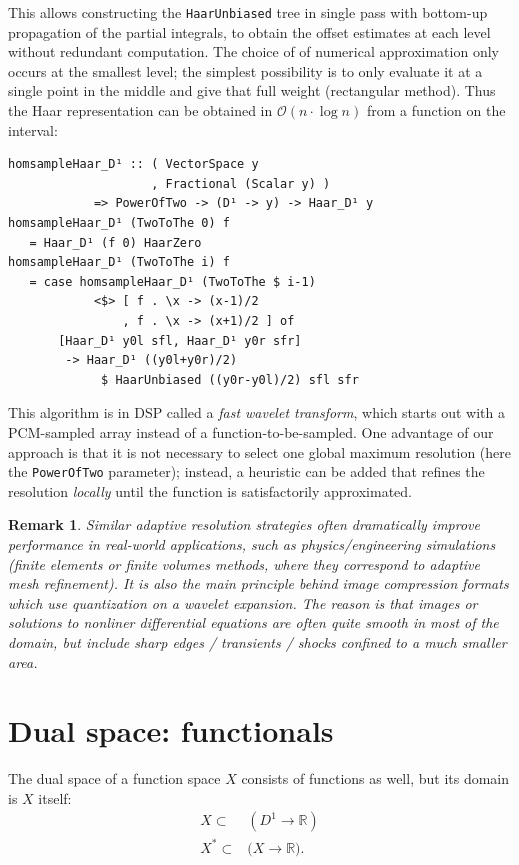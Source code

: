 \documentclass[sigplan,review,anonymous]{acmart}\settopmatter{printfolios=true,printccs=false,printacmref=false}
\theoremstyle{acmplain}
\theoremstyle{acmdefinition}
\newtheorem{remark}[theorem]{Remark}
\begin{document}
This allows constructing the \lstinline`HaarUnbiased` tree in single pass with bottom-up propagation of the partial integrals, to obtain the offset estimates at each level without redundant computation.
The choice of of numerical approximation only occurs at the smallest level;
the simplest possibility is to only evaluate it at a single point in the middle and give that full weight (rectangular method).
Thus the Haar representation can be obtained in $\mathcal{O}(n\cdot\log n)$ from a function on the interval:
\begin{lstlisting}
homsampleHaar_D¹ :: ( VectorSpace y
                    , Fractional (Scalar y) )
            => PowerOfTwo -> (D¹ -> y) -> Haar_D¹ y
homsampleHaar_D¹ (TwoToThe 0) f
   = Haar_D¹ (f 0) HaarZero
homsampleHaar_D¹ (TwoToThe i) f
   = case homsampleHaar_D¹ (TwoToThe $ i-1)
            <$> [ f . \x -> (x-1)/2
                , f . \x -> (x+1)/2 ] of
       [Haar_D¹ y0l sfl, Haar_D¹ y0r sfr]
        -> Haar_D¹ ((y0l+y0r)/2)
             $ HaarUnbiased ((y0r-y0l)/2) sfl sfr
\end{lstlisting}
This algorithm is in DSP called a \emph{fast wavelet transform}, which starts out with a PCM-sampled array instead of a function-to-be-sampled.
One advantage of our approach is that it is not necessary to select one global maximum resolution (here the \lstinline`PowerOfTwo` parameter); instead, a heuristic can be added that refines the resolution \emph{locally} until the function is satisfactorily approximated.
\begin{remark}
Similar adaptive resolution strategies often dramatically improve performance in real-world applications, such as physics/engineering simulations (finite elements or finite volumes methods, where they correspond to adaptive mesh refinement).
It is also the main principle behind image compression formats which use quantization on a wavelet expansion.
The reason is that images or solutions to nonliner differential equations are often quite smooth in most of the domain, but include sharp edges / transients / shocks confined to a much smaller area.
\end{remark}

\section{Dual space: functionals}
The dual space of a function space $X$ consists of functions as well, but its domain is $X$ itself:
\begin{align*}
  X \subset& (D^1 \to \mathbb{R})
 \\
  X^\ast \subset& \bigl(X \to \mathbb{R}\bigr).
\end{align*}
\end{document}
